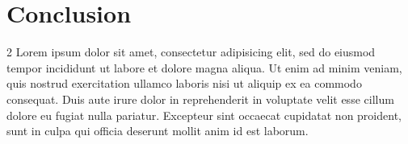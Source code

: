 \documentclass[kulak,landscape]{kulakposter}
\begin{document}
\section*{Conclusion}
\begin{multicols}{2}\setlength{\columnseprule}{0pt}
	Lorem ipsum dolor sit amet, consectetur adipisicing elit, sed do eiusmod tempor incididunt ut labore et dolore magna aliqua. Ut enim ad minim veniam, quis nostrud exercitation ullamco laboris nisi ut aliquip ex ea commodo consequat. Duis aute irure dolor in reprehenderit in voluptate velit esse cillum dolore eu fugiat nulla pariatur. Excepteur sint occaecat cupidatat non proident, sunt in culpa qui officia deserunt mollit anim id est laborum.
\end{multicols}
\end{document}

